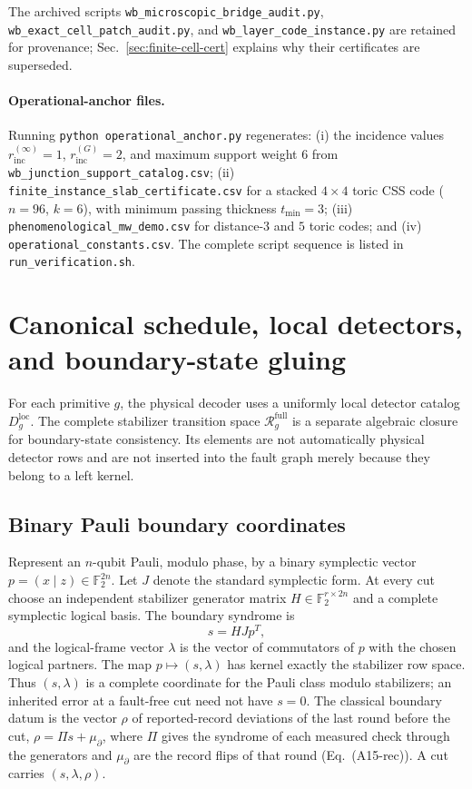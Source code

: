 \documentclass[aps,prx,reprint,superscriptaddress,nofootinbib,floatfix,longbibliography]{revtex4-2}
\theoremstyle{definition}
\begin{document}
The archived scripts \texttt{wb\_microscopic\_\allowbreak bridge\_audit.py},
\texttt{wb\_exact\_cell\_\allowbreak patch\_audit.py}, and
\texttt{wb\_layer\_code\_\allowbreak instance.py}
are retained for provenance; Sec.~\ref{sec:finite-cell-cert} explains why their
certificates are superseded.

\paragraph{Operational-anchor files.}
Running \texttt{python operational\_anchor.py} regenerates: (i) the incidence values $r_{\mathrm{inc}}^{(\infty)}=1$, $r_{\mathrm{inc}}^{(G)}=2$, and maximum support weight $6$ from \texttt{wb\_junction\_support\_catalog.csv}; (ii) \texttt{finite\_instance\_slab\_certificate.csv} for a stacked $4\times4$ toric CSS code ($n=96$, $k=6$), with minimum passing thickness $t_{\min}=3$; (iii) \texttt{phenomenological\_mw\_demo.csv} for distance-$3$ and $5$ toric codes; and (iv) \texttt{operational\_constants.csv}.  The complete script sequence is listed in \texttt{run\_verification.sh}.

\section{Canonical schedule, local detectors, and boundary-state gluing}\label{sec:catalog}

For each primitive $g$, the physical decoder uses a uniformly local detector catalog $D_g^{\mathrm{loc}}$.  The complete stabilizer transition space $\mathcal R_g^{\mathrm{full}}$ is a separate algebraic closure for boundary-state consistency.  Its elements are not automatically physical detector rows and are not inserted into the fault graph merely because they belong to a left kernel.

\subsection{Binary Pauli boundary coordinates}
Represent an $n$-qubit Pauli, modulo phase, by a binary symplectic vector
$p=(x\mid z)\in\mathbb F_2^{2n}$.  Let $J$ denote the standard symplectic
form.  At every cut choose an independent stabilizer generator matrix
$H\in\mathbb F_2^{r\times 2n}$ and a complete symplectic logical basis.  The
boundary syndrome is
\begin{equation}
 s=HJp^T,
 \tag{S1}
\end{equation}
and the logical-frame vector $\lambda$ is the vector of commutators of $p$
with the chosen logical partners.  The map $p\mapsto(s,\lambda)$ has kernel
exactly the stabilizer row space.  Thus $(s,\lambda)$ is a complete coordinate
for the Pauli class modulo stabilizers; an inherited error at a fault-free cut
need not have $s=0$.  The classical boundary datum is the vector $\rho$ of
reported-record deviations of the last round before the cut,
$\rho=\Pi s+\mu_\partial$, where $\Pi$ gives the syndrome of each measured
check through the generators and $\mu_\partial$ are the record flips of that
round (Eq.~(A15-rec)).  A cut carries $(s,\lambda,\rho)$.
\end{document}
